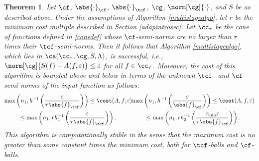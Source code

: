\documentclass[]{elsarticle}
\newtheorem{theorem}{Theorem}
\theoremstyle{definition}
\theoremstyle{remark}
\newcommand{\Fnorm}[1]{\abs{#1}_{\cf}}
\newcommand{\Ftnorm}[1]{\abs{#1}_{\tcf}}
\newcommand{\Gnorm}[1]{\norm[\cg]{#1}}
\begin{document}
\begin{theorem}  \label{MultiStageThm}  Let $\cf$, $\Fnorm{\cdot}$, $\Ftnorm{\cdot}$, $\cg$, $\Gnorm{\cdot}$, and $S$ be as described above.  Under the assumptions of Algorithm \ref{multistagealgo}, let $r$ be the minimum cost multiple described in Section \ref{adapintrosec}.  
Let $\cc_\tau$ be the cone of functions defined in \eqref{conedef} whose $\cf$-semi-norms are no larger than $\tau$ times their $\tcf$-semi-norms.  
Then it follows that Algorithm \ref{multistagealgo}, which lies in $\ca(\cc_{\tau},\cg,S,\Lambda)$, is successful,  i.e.,  $\norm[\cg]{S(f)-A(f,\varepsilon)} \le \varepsilon$ for all $f \in \cc_\tau$.  Moreover, the cost of this algorithm is bounded above and below in terms of the unknown $\tcf$- and $\cf$-semi-norms of the input function as follows:
\begin{subequations}  \label{automultistagedetcost}
\begin{multline}
\max \left(n_1, h^{-1}\left(\frac{\varepsilon}{\tau \Ftnorm{f}} \right) \right) \le 
\cost(A,f,\varepsilon) \\
\le \max \left(n_1, rh_1^{-1}\left(\frac{\varepsilon}{\tau \Ftnorm{f}} \right) \right),
\end{multline}
\begin{multline}
\max \left(n_1, h^{-1}\left(\frac{\varepsilon}{\Fnorm{f}} \right) \right) \le \cost(A,f,\varepsilon)\\
\le\max \left(n_1, rh_2^{-1}\left(\frac{\tau_{\min}\varepsilon}{\tau \Fnorm{f}} \right) \right).
\end{multline}
\end{subequations}
This algorithm is computationally stable in the sense that the maximum cost is no greater than some constant times the minimum cost, both for $\tcf$-balls and $\cf$-balls.
\end{theorem}
\end{document}
